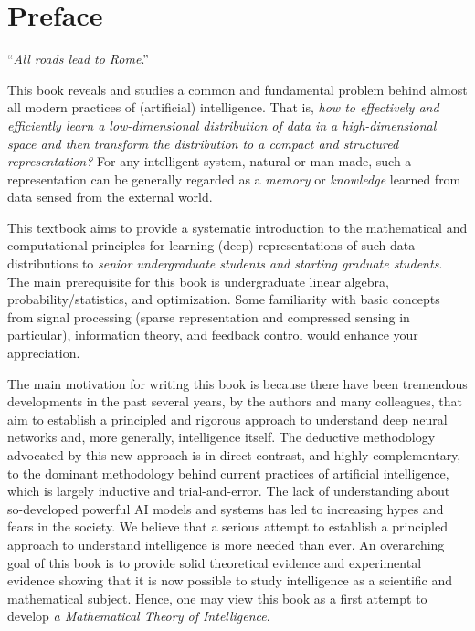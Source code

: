 \documentclass[../../book-main.tex]{subfiles}
\begin{document}
\chapter*{Preface}

\begin{center}
``{\em All roads lead to Rome}.''

\end{center}
\vspace{5mm}

This book reveals and studies a common and fundamental problem behind almost all modern practices of (artificial) intelligence. That is, {\em how to effectively and efficiently learn a low-dimensional distribution of data in a high-dimensional space and then transform the distribution to a compact and structured representation?} For any intelligent system, natural or man-made, such a representation can be generally regarded as a {\em memory} or {\em knowledge} learned from data sensed from the external world.

This textbook aims to provide a systematic introduction to the mathematical and computational principles for learning (deep) representations of such data distributions to {\em senior undergraduate students and starting graduate students}. The main prerequisite for this book is undergraduate linear algebra, probability/statistics, and optimization. Some familiarity with basic concepts from signal processing (sparse representation and compressed sensing in particular), information theory, and feedback control would enhance your appreciation. 

The main motivation for writing this book is because there have been tremendous developments in the past several years, by the authors and many colleagues, that aim to establish a principled and rigorous approach to understand deep neural networks and, more generally, intelligence itself. The deductive methodology advocated by this new approach is in direct contrast, and highly complementary, to the dominant methodology behind current practices of artificial intelligence, which is largely inductive and trial-and-error. The lack of understanding about so-developed powerful AI models and systems has led to increasing hypes and fears in the society. We believe that a serious attempt to establish a principled approach to understand intelligence is more needed than ever. An overarching goal of this book is to provide solid theoretical evidence and experimental evidence showing that it is now possible to study intelligence as a scientific and mathematical subject. Hence, one may view this book as a first attempt to develop {\em a Mathematical Theory of Intelligence}.   
\end{document}
